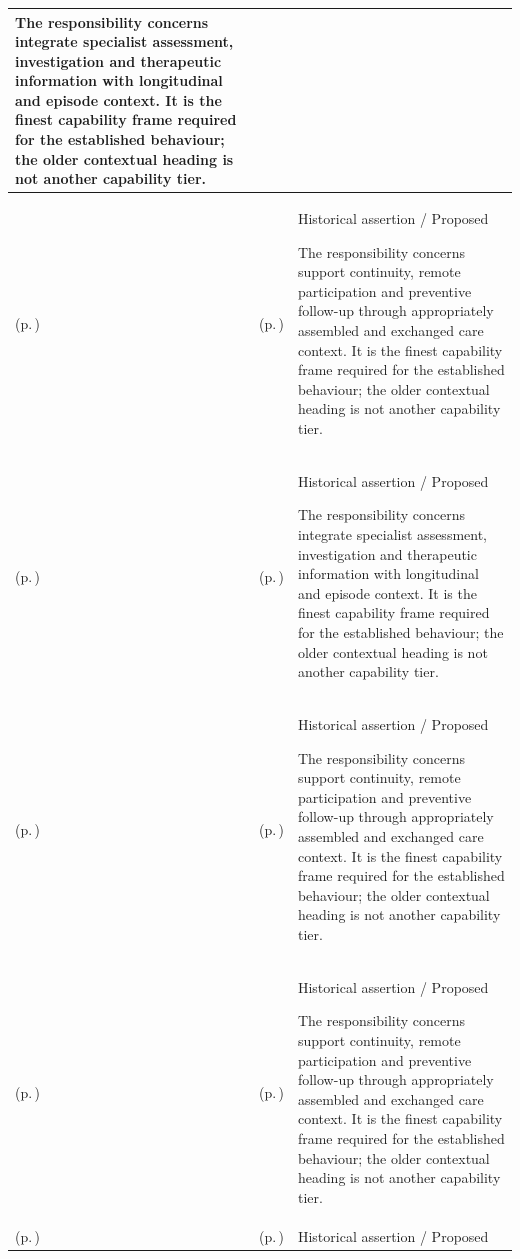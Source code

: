 \begin{longtable}{|>{\raggedright\arraybackslash}p{0.27\TableWidth}|>{\raggedright\arraybackslash}p{0.27\TableWidth}|>{\raggedright\arraybackslash}p{0.46\TableWidth}|}
The responsibility concerns integrate specialist assessment, investigation and therapeutic information with longitudinal and episode context. It is the finest capability frame required for the established behaviour; the older contextual heading is not another capability tier.\\\hline
\nameref{cap:bec-longitudinal-community-care-integration} (p.\,\pageref{cap:bec-longitudinal-community-care-integration}) & \nameref{cap:bec-preventive-care} (p.\,\pageref{cap:bec-preventive-care}) & Historical assertion / Proposed

The responsibility concerns support continuity, remote participation and preventive follow-up through appropriately assembled and exchanged care context. It is the finest capability frame required for the established behaviour; the older contextual heading is not another capability tier.\\\hline
\nameref{cap:bec-specialist-clinical-context-integration} (p.\,\pageref{cap:bec-specialist-clinical-context-integration}) & \nameref{cap:bec-rehabilitation} (p.\,\pageref{cap:bec-rehabilitation}) & Historical assertion / Proposed

The responsibility concerns integrate specialist assessment, investigation and therapeutic information with longitudinal and episode context. It is the finest capability frame required for the established behaviour; the older contextual heading is not another capability tier.\\\hline
\nameref{cap:bec-longitudinal-community-care-integration} (p.\,\pageref{cap:bec-longitudinal-community-care-integration}) & \nameref{cap:bec-community-care} (p.\,\pageref{cap:bec-community-care}) & Historical assertion / Proposed

The responsibility concerns support continuity, remote participation and preventive follow-up through appropriately assembled and exchanged care context. It is the finest capability frame required for the established behaviour; the older contextual heading is not another capability tier.\\\hline
\nameref{cap:bec-longitudinal-community-care-integration} (p.\,\pageref{cap:bec-longitudinal-community-care-integration}) & \nameref{cap:bec-outreach-care} (p.\,\pageref{cap:bec-outreach-care}) & Historical assertion / Proposed

The responsibility concerns support continuity, remote participation and preventive follow-up through appropriately assembled and exchanged care context. It is the finest capability frame required for the established behaviour; the older contextual heading is not another capability tier.\\\hline
\nameref{cap:bec-longitudinal-community-care-integration} (p.\,\pageref{cap:bec-longitudinal-community-care-integration}) & \nameref{cap:bec-remote-virtual-care} (p.\,\pageref{cap:bec-remote-virtual-care}) & Historical assertion / Proposed


\end{longtable}
